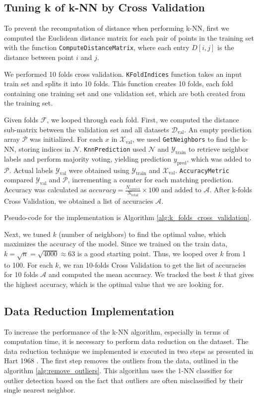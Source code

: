 \documentclass{article}
\theoremstyle{plain}
\theoremstyle{definition}
\theoremstyle{remark}
\begin{document}
\subsection{Tuning k of k-NN by Cross Validation}
\label{sec:cross_val}
To prevent the recomputation of distance when performing k-NN, first we computed the Euclidean distance matrix for each pair of points in the training set with the function \texttt{ComputeDistanceMatrix}, where each entry $D[i,j]$ is the distance between point $i$ and $j$.


We performed 10 folds cross validation. \texttt{KFoldIndices} function takes an input train set and splits it into 10 folds. This function creates 10 folds, each fold containing one training set and one validation set, which are both created from the training set.

Given folds $\mathcal{F}$, we looped through each fold. First, we computed the distance sub-matrix between the validation set and all datasets $\mathcal{D}_{\text{val}}$. An empty prediction array $\mathcal{P}$ was initialized. For each $x$ in $\mathcal{X}_{\text{val}}$, we used \texttt{GetNeighbors} to find the k-NN, storing indices in $\mathcal{N}$. \texttt{KnnPrediction} used $\mathcal{N}$ and $\mathcal{Y}_{\text{train}}$ to retrieve neighbor labels and perform majority voting, yielding prediction $y_{\text{pred}}$, which was added to $\mathcal{P}$. Actual labels $\mathcal{Y}_{\text{val}}$ were obtained using $\mathcal{Y}_{\text{train}}$ and $\mathcal{X}_{\text{val}}$. \texttt{AccuracyMetric} compared $\mathcal{Y}_{\text{val}}$ and $\mathcal{P}$, incrementing a counter for each matching prediction. Accuracy was calculated as $accuracy = \frac{N_{\text{correct}}}{N_{\text{total}}} \times 100$ and added to $\mathcal{A}$. After k-folds Cross Validation, we obtained a list of accuracies $\mathcal{A}$.

Pseudo-code for the implementation is Algorithm \ref{alg:k_folds_cross_validation}.

Next, we tuned $k$ (number of neighbors) to find the optimal value, which maximizes the accuracy of the model. Since we trained on the train data, $k =\sqrt{n} = \sqrt{4000} \approx 63$ is a good starting point. Thus, we looped over $k$ from 1 to 100. For each $k$, we ran 10-folds Cross Validation to get the list of accuracies for 10 folds $\mathcal{A}$ and computed the mean accuracy. We tracked the best $k$ that gives the highest accuracy, which is the optimal value that we are looking for.

\subsection{Data Reduction Implementation}
\label{sec:data_reduction}
    To increase the performance of the k-NN algorithm, especially in terms of computation time, it is necessary to perform data reduction on the dataset. The data reduction technique we implemented is executed in two steps as presented in Hart 1968 \cite{hart1968condensed}. The first step removes the outliers from the data, outlined in the algorithm \ref{alg:remove_outliers}. This algorithm uses the 1-NN classifier for outlier detection based on the fact that outliers are often misclassified by their single nearest neighbor.
\end{document}
